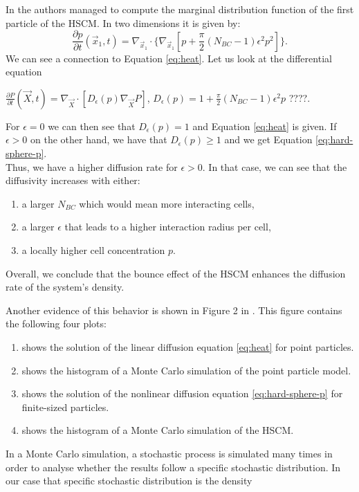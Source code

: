 In \cite{Bruna2012} the authors managed to compute the marginal distribution function of the first particle of the HSCM. 
In two dimensions it is given by:
\begin{equation}
    \frac{\partial p}{\partial t}(\vec{x}_1, t) = \nabla_{\vec{x}_1} \cdot \{\nabla_{\vec{x}_1}[p + \frac{\pi}{2}(N_{BC} - 1)\epsilon^2 p^2]\}.
    \label{eq:hard-sphere-p}
\end{equation}
We can see a connection to Equation \ref{eq:heat}. 
Let us look at the differential equation
\begin{center}
    $\frac{\partial P}{\partial t}(\vec{X}, t) =  \nabla_{\vec{X}} \cdot [D_{\epsilon}(p) \nabla_{\vec{X}} P]$,
    $D_{\epsilon}(p) = 1 + \frac{\pi}{2}(N_{BC}-1)\epsilon^2 p$ ????.
\end{center}
For $\epsilon = 0$ we can then see that $D_{\epsilon}(p) = 1$ and Equation \ref{eq:heat} is given. 
If $\epsilon > 0$ on the other hand, we have that $D_{\epsilon}(p) \geq 1$ and we get Equation \ref{eq:hard-sphere-p}. \\
Thus, we have a higher diffusion rate for $\epsilon > 0$. 
In that case, we can see that the diffusivity increases with either:
\begin{enumerate}[label=(\alph*)]
    \item a larger $N_{BC}$ which would mean more interacting cells,
    \item a larger $\epsilon$ that leads to a higher interaction radius per cell,
    \item a locally higher cell concentration $p$. 
\end{enumerate}
Overall, we conclude that the bounce effect of the HSCM enhances the diffusion rate of the system's density.






Another evidence of this behavior is shown in Figure 2 in \cite{Bruna2012}. 
This figure contains the following four plots:
\begin{enumerate}[label=(\alph*)]
    \item shows the solution of the linear diffusion equation \ref{eq:heat} for point particles.
    \item shows the histogram of a Monte Carlo simulation of the point particle model.
    \item shows the solution of the nonlinear diffusion equation \ref{eq:hard-sphere-p} for finite-sized particles.
    \item shows the histogram of a Monte Carlo simulation of the HSCM. 
\end{enumerate} 
In a Monte Carlo simulation, a stochastic process is simulated many times in order to analyse whether the results follow a specific stochastic distribution.
In our case that specific stochastic distribution is the density 

